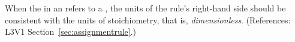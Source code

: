 When the  in an \AssignmentRule refers to a \SpeciesReference, the
units of the rule's right-hand side should be consistent with the units of stoichiometry,
that is, \emph{dimensionless}.  (References: L3V1 Section~\ref{sec:assignmentrule}.)
